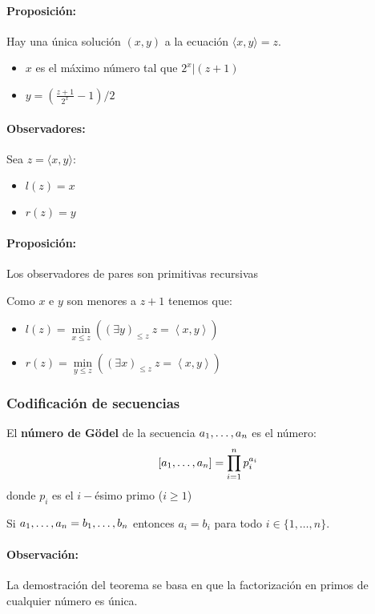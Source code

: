 \paragraph{Proposición:} Hay una única solución $(x,y)$ a la ecuación $\langle x,y \rangle = z$.
	\begin{itemize}
		\item $x$ es el máximo número tal que $2^x | (z+1)$
		\item $y = (\frac{z+1}{2^x} - 1)/2$
	\end{itemize}

\paragraph{Observadores:} Sea $z = \langle x,y \rangle$:
\begin{itemize}
	\item $l(z) = x$
	\item $r(z) = y$
\end{itemize}

\paragraph{Proposición:} Los observadores de pares son primitivas recursivas
\begin{demo}
	Como $x$ e $y$ son menores a $z +1$ tenemos que:
	\begin{itemize}
		\item $l(z) = \min\limits_{x\leq z} \left(\left(\exists y\right)_{\leq z}~ z = \left\langle x,y\right\rangle\right)$
		\item $r(z) = \min\limits_{y\leq z} \left(\left(\exists x\right)_{\leq z}~ z = \left\langle x,y\right\rangle\right)$
	\end{itemize}
\end{demo}

\subsubsection{Codificación de secuencias}
El \textbf{número de Gödel} de la secuencia $a_1,\dots, a_{n}$ es el número:
$$[a_1,\dots, a_{n}] = \prod_{i=1}^{n} p_i^{a_i}$$
donde $p_i$ es el $i-$ésimo primo ($i\geq 1$)

\begin{teorema}
Si $a_1,\dots, a_{n} = b_1,\dots, b_{n}$ entonces $a_i = b_i$ para todo $i\in\{1,\dots,n\}$.
\end{teorema}

\paragraph{Observación:} La demostración del teorema se basa en que la factorización en primos de cualquier número es única.

